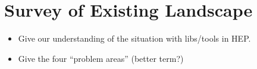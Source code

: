\section{Survey of Existing Landscape}

\begin{itemize}
\item Give our understanding of the situation with libs/tools in HEP.
\item Give the four ``problem areas'' (better term?)
\end{itemize}







